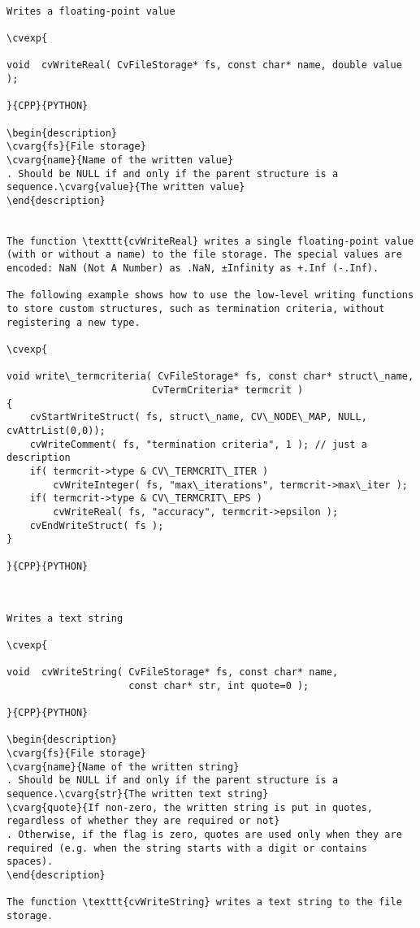 \begin{verbatim}

Writes a floating-point value

\cvexp{

void  cvWriteReal( CvFileStorage* fs, const char* name, double value );

}{CPP}{PYTHON}

\begin{description}
\cvarg{fs}{File storage}
\cvarg{name}{Name of the written value}
. Should be NULL if and only if the parent structure is a sequence.\cvarg{value}{The written value}
\end{description}


The function \texttt{cvWriteReal} writes a single floating-point value (with or without a name) to the file storage. The special values are encoded: NaN (Not A Number) as .NaN, ±Infinity as +.Inf (-.Inf).

The following example shows how to use the low-level writing functions to store custom structures, such as termination criteria, without registering a new type.

\cvexp{

void write\_termcriteria( CvFileStorage* fs, const char* struct\_name,
                         CvTermCriteria* termcrit )
{
    cvStartWriteStruct( fs, struct\_name, CV\_NODE\_MAP, NULL, cvAttrList(0,0));
    cvWriteComment( fs, "termination criteria", 1 ); // just a description
    if( termcrit->type & CV\_TERMCRIT\_ITER )
        cvWriteInteger( fs, "max\_iterations", termcrit->max\_iter );
    if( termcrit->type & CV\_TERMCRIT\_EPS )
        cvWriteReal( fs, "accuracy", termcrit->epsilon );
    cvEndWriteStruct( fs );
}

}{CPP}{PYTHON}


\end{verbatim}
\label{WriteString}
\begin{verbatim}

Writes a text string

\cvexp{

void  cvWriteString( CvFileStorage* fs, const char* name,
                     const char* str, int quote=0 );

}{CPP}{PYTHON}

\begin{description}
\cvarg{fs}{File storage}
\cvarg{name}{Name of the written string}
. Should be NULL if and only if the parent structure is a sequence.\cvarg{str}{The written text string}
\cvarg{quote}{If non-zero, the written string is put in quotes, regardless of whether they are required or not}
. Otherwise, if the flag is zero, quotes are used only when they are required (e.g. when the string starts with a digit or contains spaces).
\end{description}

The function \texttt{cvWriteString} writes a text string to the file storage.


\end{verbatim}
